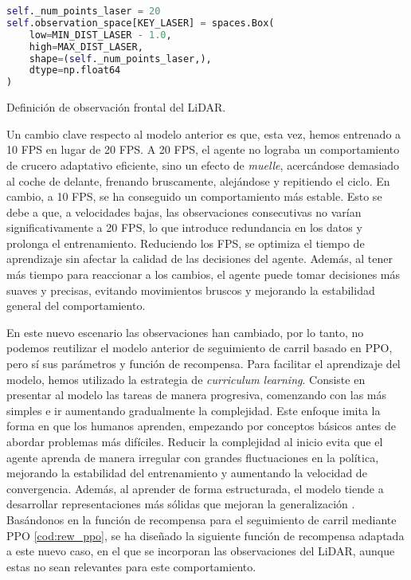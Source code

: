 \begin{code}[h]
\begin{lstlisting}[language=Python]
self._num_points_laser = 20
self.observation_space[KEY_LASER] = spaces.Box(
	low=MIN_DIST_LASER - 1.0,
	high=MAX_DIST_LASER,
	shape=(self._num_points_laser,),
	dtype=np.float64
)
\end{lstlisting}
\caption[Definición de observación frontal del \ac{LiDAR}]{Definición de observación frontal del \ac{LiDAR}.}
\label{cod:obs_laser_front}
\end{code}

Un cambio clave respecto al modelo anterior es que, esta vez, hemos entrenado a 10 \ac{FPS} en lugar de 20 \ac{FPS}. A 20 \ac{FPS}, el agente no lograba un comportamiento de crucero adaptativo eficiente, sino un efecto de \textit{muelle}, acercándose demasiado al coche de delante, frenando bruscamente, alejándose y repitiendo el ciclo. En cambio, a 10 \ac{FPS}, se ha conseguido un comportamiento más estable. Esto se debe a que, a velocidades bajas, las observaciones consecutivas no varían significativamente a 20 \ac{FPS}, lo que introduce redundancia en los datos y prolonga el entrenamiento. Reduciendo los \ac{FPS}, se optimiza el tiempo de aprendizaje sin afectar la calidad de las decisiones del agente. Además, al tener más tiempo para reaccionar a los cambios, el agente puede tomar decisiones más suaves y precisas, evitando movimientos bruscos y mejorando la estabilidad general del comportamiento.

En este nuevo escenario las observaciones han cambiado, por lo tanto, no podemos reutilizar el modelo anterior de seguimiento de carril basado en \ac{PPO}, pero sí sus parámetros y función de recompensa. Para facilitar el aprendizaje del modelo, hemos utilizado la estrategia de \textit{curriculum learning}. Consiste en presentar al modelo las tareas de manera progresiva, comenzando con las más simples e ir aumentando gradualmente la complejidad. Este enfoque imita la forma en que los humanos aprenden, empezando por conceptos básicos antes de abordar problemas más difíciles. Reducir la complejidad al inicio evita que el agente aprenda de manera irregular con grandes fluctuaciones en la política, mejorando la estabilidad del entrenamiento y aumentando la velocidad de convergencia. Además, al aprender de forma estructurada, el modelo tiende a desarrollar representaciones más sólidas que mejoran la generalización \cite{curriculum-learning}. Basándonos en la función de recompensa para el seguimiento de carril mediante \ac{PPO} \ref{cod:rew_ppo}, se ha diseñado la siguiente función de recompensa adaptada a este nuevo caso, en el que se incorporan las observaciones del \ac{LiDAR}, aunque estas no sean relevantes para este comportamiento.

